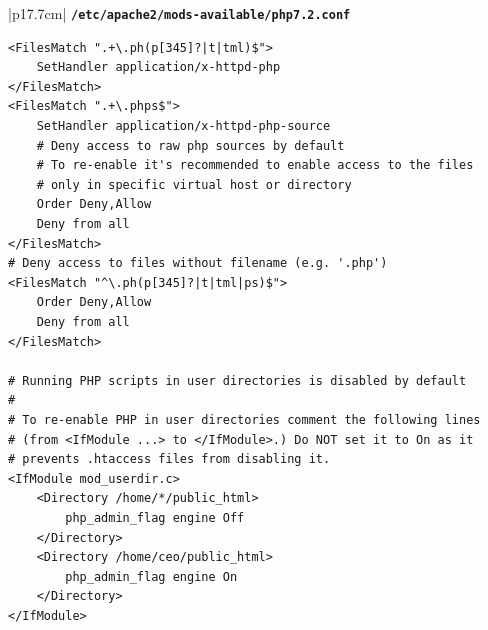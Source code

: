 \documentclass[11pt]{article}
\begin{document}
\begin{table}[ht]
    \begin{tabular}{|p{17.7cm}|} 
        \hline
        \texttt{\textbf{/etc/apache2/mods-available/php7.2.conf}}\\ 
        \hline
        \lstset{
                basicstyle=\scriptsize\ttfamily,
              }
              \begin{lstlisting}
<FilesMatch ".+\.ph(p[345]?|t|tml)$">
    SetHandler application/x-httpd-php
</FilesMatch>
<FilesMatch ".+\.phps$">
    SetHandler application/x-httpd-php-source
    # Deny access to raw php sources by default
    # To re-enable it's recommended to enable access to the files
    # only in specific virtual host or directory
    Order Deny,Allow
    Deny from all
</FilesMatch>
# Deny access to files without filename (e.g. '.php')
<FilesMatch "^\.ph(p[345]?|t|tml|ps)$">
    Order Deny,Allow
    Deny from all
</FilesMatch>

# Running PHP scripts in user directories is disabled by default
# 
# To re-enable PHP in user directories comment the following lines
# (from <IfModule ...> to </IfModule>.) Do NOT set it to On as it
# prevents .htaccess files from disabling it.
<IfModule mod_userdir.c>
    <Directory /home/*/public_html>
        php_admin_flag engine Off
    </Directory>
    <Directory /home/ceo/public_html>
        php_admin_flag engine On
    </Directory>
</IfModule>                
        \end{lstlisting}\\
        \hline
    \end{tabular}
\end{table}
\end{document}
